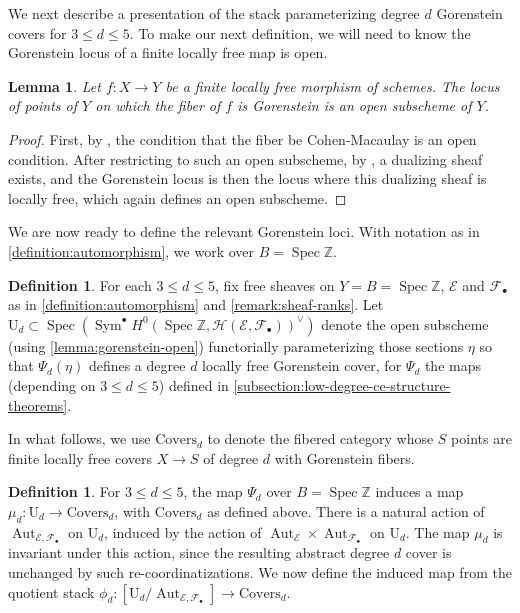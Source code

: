 \documentclass[12 pt]{amsart}
\newcommand{\rboxed}[1]{#1}
\theoremstyle{plain}
\newtheorem{lemma}[theorem]{Lemma}
\theoremstyle{definition}
\newtheorem{definition}[theorem]{Definition}
\theoremstyle{remark}
\numberwithin{equation}{section}
\newcommand\bz{\mathbb Z}
\newcommand\sce{\mathscr E}
\newcommand\scf{\mathscr F}
\newcommand\sch{\mathscr H}
\DeclareMathOperator\spec{\operatorname{Spec}}
\newcommand\coverstack[1]{\mathrm{Covers}_{d}} %
\newcommand\gorensteinsections[1]{\mathrm{U}_{d}} %
\DeclareMathOperator\sym{Sym}
\DeclareMathOperator\aut{Aut}
\begin{document}
We next describe a presentation of the stack parameterizing degree $d$
Gorenstein covers for $3 \leq d \leq 5$.  To make our next definition, we will need to know the Gorenstein locus of a
finite locally free map is open.

\begin{lemma}
	\label{lemma:gorenstein-open}
	Let $f: X \to Y$ be a finite locally free morphism of schemes.
	The locus of points of $Y$ on which the fiber of $f$ is Gorenstein is an
	open subscheme of $Y$.
\end{lemma}
\begin{proof}
	First, by 
\cite[\href{https://stacks.math.columbia.edu/tag/00RH}{Tag
00RH}]{stacks-project},
the condition that the fiber be Cohen-Macaulay is an open condition.
After restricting to such an open subscheme,
by
\cite[Thm.\ 3.5.1]{conrad:grothendieck-duality},
a dualizing sheaf exists, and the Gorenstein locus is then the locus where this
dualizing sheaf is locally free, which again defines an open subscheme.
\end{proof}

We are now ready to define the relevant Gorenstein loci.
With notation as in
\autoref{definition:automorphism}, we work over $B = \spec \bz$.  
\begin{definition}
	\label{definition:gorenstein-sections}
	For each $3 \leq d \leq 5$, fix free sheaves on $Y = B = \spec \bz$, $\sce$ and
$\scf_\bullet$ as in \autoref{definition:automorphism} and
\autoref{remark:sheaf-ranks}.
Let $\rboxed{
\gorensteinsections d } \subset \spec \left( \sym^\bullet H^0(\spec \bz, \sch(\sce,
\scf_\bullet))^\vee \right)$ denote the open subscheme 
(using \autoref{lemma:gorenstein-open})
functorially parameterizing those
sections $\eta$ so that $\Psi_d(\eta)$ defines a degree $d$ locally free
Gorenstein cover, for $\Psi_d$ the maps (depending on $3 \leq d \leq 5$) defined
in \autoref{subsection:low-degree-ce-structure-theorems}.  
\end{definition}

In what follows, we use $\coverstack d$ to
denote the fibered category whose $S$ points are finite locally free covers $X
\to S$ of degree $d$ with Gorenstein fibers.

\begin{definition}
	\label{definition:sections-to-coverstack}
	For $3 \leq d \leq 5$, the map $\Psi_d$ over $B = \spec \bz$ induces a map $\mu_d:
	\gorensteinsections d \to \coverstack d$, with $\coverstack d$
	as defined above.
There is a natural
action of $\aut_{\sce, \scf_\bullet}$ on $\gorensteinsections d$, induced by the
action of $\aut_{\sce} \times \aut_{\scf_\bullet}$ on $\gorensteinsections d$.
The map $\mu_d$ is invariant under this action, since the resulting
abstract degree $d$ cover is unchanged by such re-coordinatizations. We now
define the induced map from the quotient stack $\phi_d : [\gorensteinsections
d/\aut_{\sce, \scf_\bullet}] \to \coverstack d$.
\end{definition}
\end{document}
